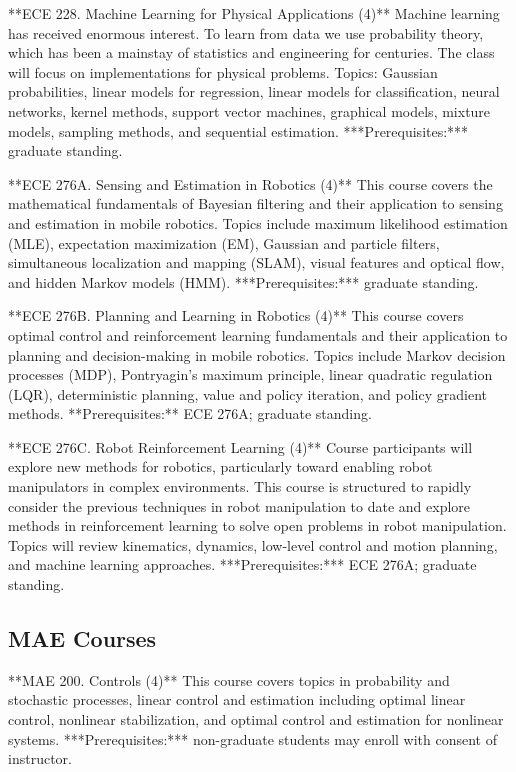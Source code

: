 \documentclass[11pt,letterpaper]{article}
\begin{document}
**ECE 228. Machine Learning for Physical Applications (4)**
Machine learning has received enormous interest. To learn from data we
use probability theory, which has been a mainstay of statistics and
engineering for centuries. The class will focus on implementations for
physical problems. Topics: Gaussian probabilities, linear models for
regression, linear models for classification, neural networks, kernel
methods, support vector machines, graphical models, mixture models,
sampling methods, and sequential estimation. ***Prerequisites:***
graduate standing.

**ECE 276A. Sensing and Estimation in Robotics (4)** This course covers
the mathematical fundamentals of Bayesian filtering and their
application to sensing and estimation in mobile robotics. Topics include
maximum likelihood estimation (MLE), expectation maximization (EM),
Gaussian and particle filters, simultaneous localization and mapping
(SLAM), visual features and optical flow, and hidden Markov models
(HMM). ***Prerequisites:*** graduate standing.

**ECE 276B. Planning and Learning in Robotics (4)** This course covers
optimal control and reinforcement learning fundamentals and their
application to planning and decision-making in mobile robotics. Topics
include Markov decision processes (MDP), Pontryagin’s maximum principle,
linear quadratic regulation (LQR), deterministic planning, value and
policy iteration, and policy gradient methods. **Prerequisites:** ECE
276A; graduate standing.

**ECE 276C. Robot Reinforcement Learning (4)** Course participants will
explore new methods for robotics, particularly toward enabling robot
manipulators in complex environments. This course is structured to
rapidly consider the previous techniques in robot manipulation to date
and explore methods in reinforcement learning to solve open problems in
robot manipulation. Topics will review kinematics, dynamics, low-level
control and motion planning, and machine learning approaches.
***Prerequisites:*** ECE 276A; graduate standing.

\subsection{MAE Courses}

**MAE 200. Controls (4)** This course covers topics in probability and
stochastic processes, linear control and estimation including optimal
linear control, nonlinear stabilization, and optimal control and
estimation for nonlinear systems. ***Prerequisites:*** non-graduate
students may enroll with consent of instructor.
\end{document}
